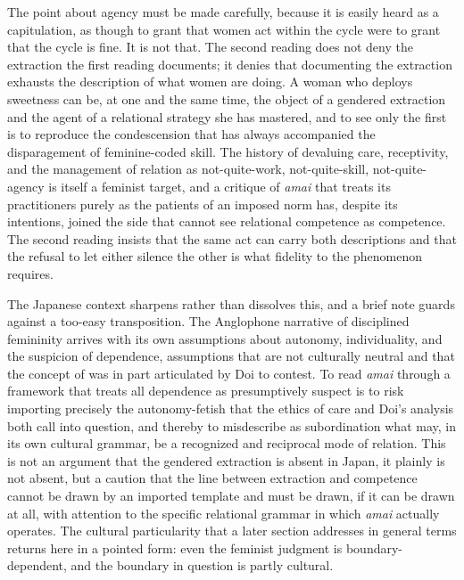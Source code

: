 The point about agency must be made carefully, because it is easily heard as a capitulation, as though to grant that women act within the cycle were to grant that the cycle is fine. It is not that. The second reading does not deny the extraction the first reading documents; it denies that documenting the extraction exhausts the description of what women are doing. A woman who deploys sweetness can be, at one and the same time, the object of a gendered extraction and the agent of a relational strategy she has mastered, and to see only the first is to reproduce the condescension that has always accompanied the disparagement of feminine-coded skill. The history of devaluing care, receptivity, and the management of relation as not-quite-work, not-quite-skill, not-quite-agency is itself a feminist target, and a critique of \textit{amai} that treats its practitioners purely as the patients of an imposed norm has, despite its intentions, joined the side that cannot see relational competence as competence. The second reading insists that the same act can carry both descriptions and that the refusal to let either silence the other is what fidelity to the phenomenon requires.

The Japanese context sharpens rather than dissolves this, and a brief note guards against a too-easy transposition. The Anglophone narrative of disciplined femininity arrives with its own assumptions about autonomy, individuality, and the suspicion of dependence, assumptions that are not culturally neutral and that the concept of  was in part articulated by Doi to contest. To read \textit{amai} through a framework that treats all dependence as presumptively suspect is to risk importing precisely the autonomy-fetish that the ethics of care and Doi's analysis both call into question, and thereby to misdescribe as subordination what may, in its own cultural grammar, be a recognized and reciprocal mode of relation. This is not an argument that the gendered extraction is absent in Japan, it plainly is not absent, but a caution that the line between extraction and competence cannot be drawn by an imported template and must be drawn, if it can be drawn at all, with attention to the specific relational grammar in which \textit{amai} actually operates. The cultural particularity that a later section addresses in general terms returns here in a pointed form: even the feminist judgment is boundary-dependent, and the boundary in question is partly cultural.

